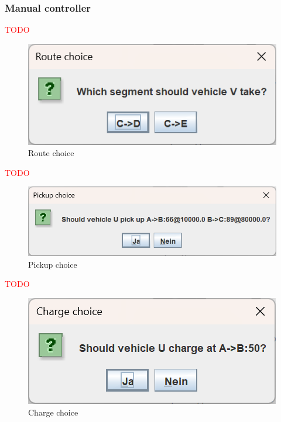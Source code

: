 \documentclass[10pt,twocolumn]{article}
\begin{document}
\subsubsection{Manual controller}
\label{sec:controller-manual}

\textcolor{red}{TODO}

\begin{figure}[h!]
    \centering
    \includegraphics[scale=0.4]{../../screenshots/manual-controller-route.png}
    \caption{Route choice}
    \label{fig:manual-controller-route}
\end{figure}

\textcolor{red}{TODO}

\begin{figure}[h!]
    \centering
    \includegraphics[scale=0.4]{../../screenshots/manual-controller-demand.png}
    \caption{Pickup choice}
    \label{fig:manual-controller-demand}
\end{figure}

\textcolor{red}{TODO}

\begin{figure}[h!]
    \centering
    \includegraphics[scale=0.4]{../../screenshots/manual-controller-charge.png}
    \caption{Charge choice}
    \label{fig:manual-controller-charge}
\end{figure}
\end{document}
